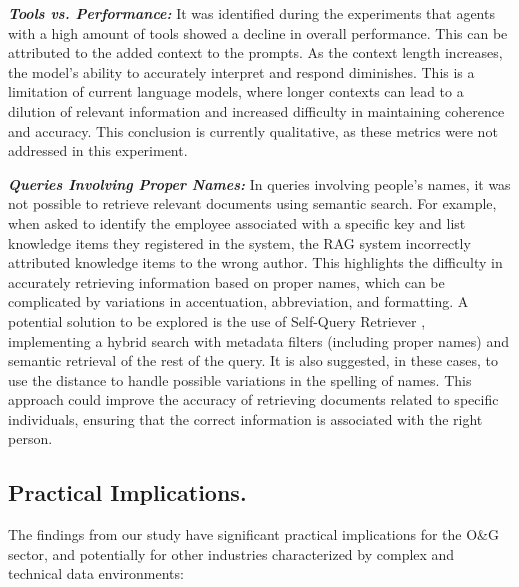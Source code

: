             \setlength{\parindent}{1em}
            \textbf{\textit{Tools vs. Performance:}} 
                It was identified during the experiments that agents with a high amount of tools showed a decline in overall performance. This can be attributed to the added context to the prompts. As the context length increases, the model's ability to accurately interpret and respond diminishes. This is a limitation of current language models, where longer contexts can lead to a dilution of relevant information and increased difficulty in maintaining coherence and accuracy. This conclusion is currently qualitative, as these metrics were not addressed in this experiment.

            
            \setlength{\parindent}{1em}
            \textbf{\textit{Queries Involving Proper Names:}}
                In queries involving people's names, it was not possible to retrieve relevant documents using semantic search. For example, when asked to identify the employee associated with a specific key and list knowledge items they registered in the system, the RAG system incorrectly attributed knowledge items to the wrong author. This highlights the difficulty in accurately retrieving information based on proper names, which can be complicated by variations in accentuation, abbreviation, and formatting.
                A potential solution to be explored is the use of Self-Query Retriever \cite{LangchainSelfQuery2023}, implementing a hybrid search with metadata filters (including proper names) and semantic retrieval of the rest of the query. It is also suggested, in these cases, to use the \cite{Levenshtein1966} distance to handle possible variations in the spelling of names. This approach could improve the accuracy of retrieving documents related to specific individuals, ensuring that the correct information is associated with the right person.
                
        
        \subsection{Practical Implications.} 
                    The findings from our study have significant practical implications for the O\&G sector, and potentially for other industries characterized by complex and technical data environments:
                    
